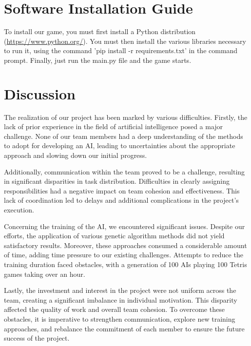 \documentclass[conference]{IEEEtran}
\begin{document}
\section{Software Installation Guide}
To install our game, you must first install a Python distribution (\url{https://www.python.org/}). You must then install the various libraries necessary to run it, using the command 'pip install -r requirements.txt' in the command prompt. Finally, just run the main.py file and the game starts.

\section{Discussion}
The realization of our project has been marked by various difficulties. Firstly, the lack of prior experience in the field of artificial intelligence posed a major challenge. None of our team members had a deep understanding of the methods to adopt for developing an AI, leading to uncertainties about the appropriate approach and slowing down our initial progress.

Additionally, communication within the team proved to be a challenge, resulting in significant disparities in task distribution. Difficulties in clearly assigning responsibilities had a negative impact on team cohesion and effectiveness. This lack of coordination led to delays and additional complications in the project's execution.

Concerning the training of the AI, we encountered significant issues. Despite our efforts, the application of various genetic algorithm methods did not yield satisfactory results. Moreover, these approaches consumed a considerable amount of time, adding time pressure to our existing challenges. Attempts to reduce the training duration faced obstacles, with a generation of 100 AIs playing 100 Tetris games taking over an hour.

Lastly, the investment and interest in the project were not uniform across the team, creating a significant imbalance in individual motivation. This disparity affected the quality of work and overall team cohesion. To overcome these obstacles, it is imperative to strengthen communication, explore new training approaches, and rebalance the commitment of each member to ensure the future success of the project.
\end{document}
